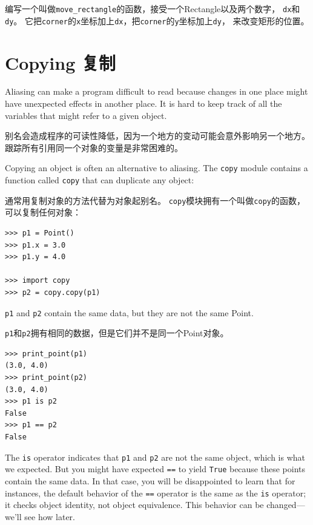 \documentclass[10pt]{book}
\begin{document}
\begin{CJK}{UTF8}{gbsn}
\begin{exercise}
编写一个叫做\verb"move_rectangle"的函数，接受一个Rectangle以及两个数字，
{\tt dx}和{\tt dy}。
它把{\tt corner}的{\tt x}坐标加上{\tt dx}，把{\tt corner}的{\tt y}坐标加上{\tt dy}，
来改变矩形的位置。


\end{exercise}


\section{Copying 复制}
\label{copying}

Aliasing can make a program difficult to read because changes
in one place might have unexpected effects in another place.
It is hard to keep track of all the variables that might refer
to a given object.

别名会造成程序的可读性降低，因为一个地方的变动可能会意外影响另一个地方。
跟踪所有引用同一个对象的变量是非常困难的。

Copying an object is often an alternative to aliasing.
The {\tt copy} module contains a function called {\tt copy} that
can duplicate any object:

通常用复制对象的方法代替为对象起别名。
{\tt copy}模块拥有一个叫做{\tt copy}的函数，可以复制任何对象：

\begin{verbatim}
>>> p1 = Point()
>>> p1.x = 3.0
>>> p1.y = 4.0

>>> import copy
>>> p2 = copy.copy(p1)
\end{verbatim}
%
{\tt p1} and {\tt p2} contain the same data, but they are
not the same Point.

{\tt p1}和{\tt p2}拥有相同的数据，但是它们并不是同一个Point对象。

\begin{verbatim}
>>> print_point(p1)
(3.0, 4.0)
>>> print_point(p2)
(3.0, 4.0)
>>> p1 is p2
False
>>> p1 == p2
False
\end{verbatim}
%
The {\tt is} operator indicates that {\tt p1} and {\tt p2} are not the
same object, which is what we expected.  But you might have expected
{\tt ==} to yield {\tt True} because these points contain the same
data.  In that case, you will be disappointed to learn that for
instances, the default behavior of the {\tt ==} operator is the same
as the {\tt is} operator; it checks object identity, not object
equivalence.  This behavior can be changed---we'll see how later.


\end{CJK}
\end{document}
